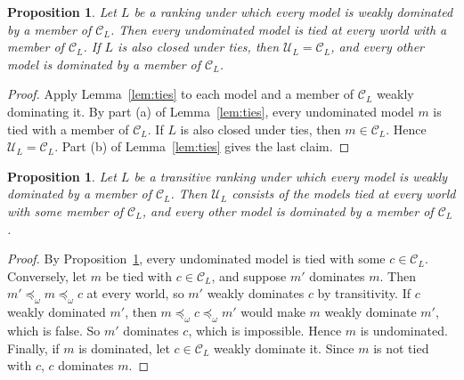\documentclass[11pt]{article}
\newtheorem{proposition}[theorem]{Proposition}
\theoremstyle{definition}
\newcommand{\C}{\mathcal C}
\newcommand{\U}{\mathcal U}
\begin{document}
\begin{proposition}\label{prop:conclusion}
Let $L$ be a ranking under which every model is weakly dominated by a member of $\C_L$. Then every undominated model is tied at every world with a member of $\C_L$. If $L$ is also closed under ties, then $\U_L=\C_L$, and every other model is dominated by a member of $\C_L$.
\end{proposition}
\begin{proof}
Apply Lemma~\ref{lem:ties} to each model and a member of $\C_L$ weakly dominating it. By part (a) of Lemma~\ref{lem:ties}, every undominated model $m$ is tied with a member of $\C_L$. If $L$ is also closed under ties, then $m\in\C_L$. Hence $\U_L=\C_L$. Part (b) of Lemma~\ref{lem:ties} gives the last claim.
\end{proof}

\begin{proposition}\label{prop:profiles}
Let $L$ be a transitive ranking under which every model is weakly dominated by a member of $\C_L$. Then $\U_L$ consists of the models tied at every world with some member of $\C_L$, and every other model is dominated by a member of $\C_L$.
\end{proposition}
\begin{proof}
By Proposition~\ref{prop:conclusion}, every undominated model is tied with some $c\in\C_L$. Conversely, let $m$ be tied with $c\in\C_L$, and suppose $m'$ dominates $m$. Then $m'\preceq_\omega m\preceq_\omega c$ at every world, so $m'$ weakly dominates $c$ by transitivity. If $c$ weakly dominated $m'$, then $m\preceq_\omega c\preceq_\omega m'$ would make $m$ weakly dominate $m'$, which is false. So $m'$ dominates $c$, which is impossible. Hence $m$ is undominated. Finally, if $m$ is dominated, let $c\in\C_L$ weakly dominate it. Since $m$ is not tied with $c$, $c$ dominates $m$.
\end{proof}
\end{document}
